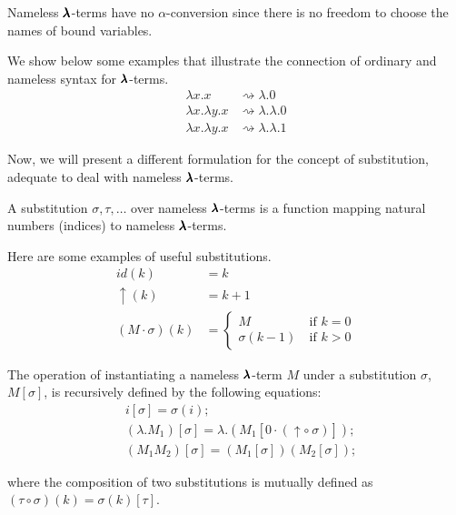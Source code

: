 \begin{remark}
  Nameless $\pmb{\lambda}$-terms have no $\alpha$-conversion since there is no freedom to choose the names of bound variables.
\end{remark}

We show below some examples that illustrate the connection of ordinary and nameless syntax for $\pmb{\lambda}$-terms.
\begin{align*}
  \lambda x . x &\rightsquigarrow \lambda . 0 \\
  \lambda x . \lambda y . x &\rightsquigarrow \lambda . \lambda . 0 \\
  \lambda x . \lambda y . x &\rightsquigarrow \lambda . \lambda . 1
\end{align*}

Now, we will present a different formulation for the concept of substitution, adequate to deal with nameless $\pmb{\lambda}$-terms.
\begin{definition}[Substitution]
  A substitution $\sigma, \tau, \dots$ over nameless $\pmb{\lambda}$-terms is a function mapping natural numbers (indices) to nameless $\pmb{\lambda}$-terms.
\end{definition}

Here are some examples of useful substitutions.
\begin{align*}
  id(k) &= k \\
  \uparrow(k) &= k+1 \\
  (M \cdot \sigma)(k) &=
                        \begin{cases}
                          M & \ \text{if $k = 0$} \\
                          \sigma(k-1) & \ \text{if $k > 0$}
                        \end{cases}
\end{align*}

\begin{definition}
  The operation of instantiating a nameless $\pmb{\lambda}$-term $M$ under a substitution $\sigma$, $M[\sigma]$, is recursively defined by the following equations:
  \begin{align*}
    & i[\sigma] = \sigma(i); \\
    & (\lambda . M_1)[\sigma] = \lambda . (M_1[0 \cdot (\uparrow \circ \ \sigma)]); \\
    & (M_1 M_2)[\sigma] = (M_1[\sigma]) (M_2[\sigma]);
  \end{align*}

  where the composition of two substitutions is mutually defined as $(\tau \circ \sigma)(k) = \sigma(k)[\tau]$.
\end{definition}

